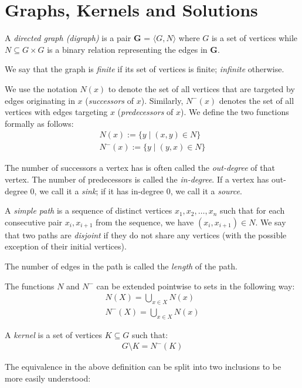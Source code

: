 \section{Graphs, Kernels and Solutions}
\label{sec:Graphs, Kernels and Solutions}
\begin{definition}
  A \textit{directed graph (digraph)} is a pair \textbf{G} = $\langle G,N \rangle$ where $G$ is a set of vertices while $N \subseteq G \times G$ is a binary relation representing the edges in \textbf{G}.
\end{definition}
We say that the graph is \textit{finite} if its set of vertices is finite; \textit{infinite} otherwise.

We use the notation $N(x)$ to denote the set of all vertices that are targeted by edges originating in $x$ (\textit{successors} of $x$).
Similarly, $N^-(x)$ denotes the set of all vertices with edges targeting $x$ (\textit{predecessors} of $x$).
We define the two functions formally as follows:
\begin{align}
  N(x) := \{y \;|\; (x,y) \in N\}\\
  N^-(x) := \{ y \;|\; (y,x) \in N \}
\end{align}
\begin{definition}
  The number of successors a vertex has is often called the \textit{out-degree} of that vertex.
  The number of predecessors is called the \textit{in-degree}.
  If a vertex has out-degree 0, we call it a \textit{sink}; if it has in-degree 0, we call it a \textit{source}.
\end{definition}
\begin{definition}
  A \textit{simple path} is a sequence of distinct vertices $x_1,x_2,\dots,x_n$ such that for each consecutive pair $x_i,x_{i+1}$ from the sequence, we have $(x_i, x_{i+1}) \in N$.
  We say that two paths are \textit{disjoint} if they do not share any vertices (with the possible exception of their initial vertices).
\end{definition}
The number of edges in the path is called the \textit{length} of the path.

The functions $N$ and $N^-$ can be extended pointwise to sets in the following way:
\begin{align}
  N(X) = \bigcup_{x \in X} N(x)\\
  N^-(X) = \bigcup_{x \in X} N(x)
\end{align}

\begin{definition}
  A \textit{kernel} is a set of vertices $K \subseteq G$ such that:
  \begin{align}
    G \setminus K = N^-(K)
  \end{align}
\end{definition}
The equivalence in the above definition can be split into two inclusions to be more easily understood:

